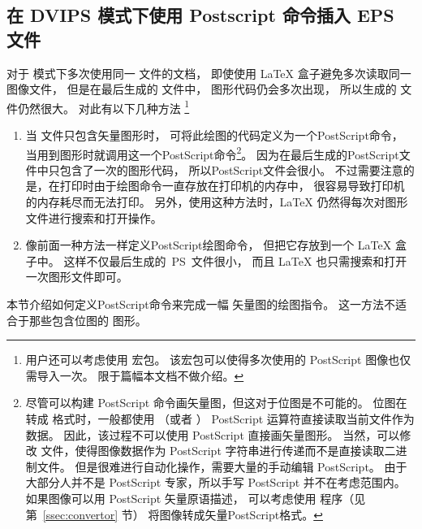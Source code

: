 \subsection{在 DVIPS 模式下使用 Postscript 命令插入 EPS 文件}\label{ssec:defps}

对于  模式下多次使用同一  文件的文档，
即使使用 \LaTeX{} 盒子避免多次读取同一图像文件，
但是在最后生成的 文件中， 图形代码仍会多次出现，
所以生成的  文件仍然很大。
对此有以下几种方法 \footnote{
	用户还可以考虑使用  宏包。
	该宏包可以使得多次使用的 PostScript 图像也仅需导入一次。
	限于篇幅本文档不做介绍。}
\begin{enumerate}
	\item 当  文件只包含矢量图形时，
	可将此绘图的代码定义为一个PostScript命令，
	当用到图形时就调用这一个PostScript命令\footnote{
		尽管可以构建 PostScript 命令画矢量图，但这对于位图是不可能的。
		位图在转成  格式时，一般都使用  （或者 ） PostScript 运算符直接读取当前文件作为数据。
		因此，该过程不可以使用 PostScript 直接画矢量图形。
		当然，可以修改  文件，使得图像数据作为 PostScript 字符串进行传递而不是直接读取二进制文件。
		但是很难进行自动化操作，需要大量的手动编辑 PostScript。
		由于大部分人并不是 PostScript 专家，所以手写 PostScript 并不在考虑范围内。
		如果图像可以用 PostScript 矢量原语描述，
		可以考虑使用  程序（见第~\ref{ssec:convertor} 节） 将图像转成矢量PostScript格式。}。
	因为在最后生成的PostScript文件中只包含了一次的图形代码，
	所以PostScript文件会很小。
	不过需要注意的是，在打印时由于绘图命令一直存放在打印机的内存中，
	很容易导致打印机的内存耗尽而无法打印。
	另外，使用这种方法时，\LaTeX{} 仍然得每次对图形文件进行搜索和打开操作。
	\item 像前面一种方法一样定义PostScript绘图命令，
	但把它存放到一个 \LaTeX{} 盒子中。
	这样不仅最后生成的~PS~文件很小，
	而且 \LaTeX{} 也只需搜索和打开一次图形文件即可。
\end{enumerate}

本节介绍如何定义PostScript命令来完成一幅  矢量图的绘图指令。
这一方法不适合于那些包含位图的  图形。


